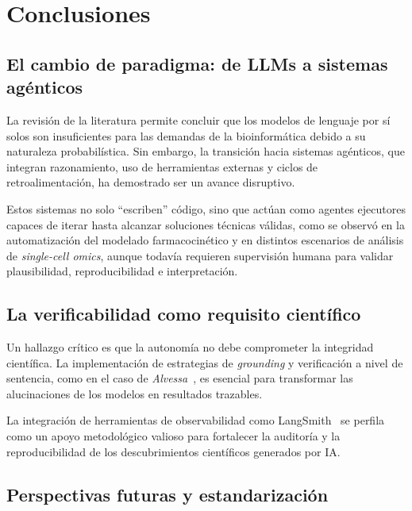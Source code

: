 
\section{Conclusiones}\label{sec:conclusions}

\subsection{El cambio de paradigma: de LLMs a sistemas agénticos}
\label{subsec:paradigm-shift}

La revisión de la literatura permite concluir que los modelos de lenguaje por sí
solos son insuficientes para las demandas de la bioinformática debido a su
naturaleza probabilística. Sin embargo, la transición hacia sistemas agénticos,
que integran razonamiento, uso de herramientas externas y ciclos de
retroalimentación, ha demostrado ser un avance disruptivo.

Estos sistemas no solo ``escriben'' código, sino que actúan como agentes
ejecutores capaces de iterar hasta alcanzar soluciones técnicas válidas, como se
observó en la automatización del modelado farmacocinético y en distintos
escenarios de análisis de \textit{single-cell omics}, aunque todavía requieren
supervisión humana para validar plausibilidad, reproducibilidad e interpretación.

\subsection{La verificabilidad como requisito científico}
\label{subsec:verifiability}

Un hallazgo crítico es que la autonomía no debe comprometer la integridad
científica. La implementación de estrategias de \textit{grounding} y
verificación a nivel de sentencia, como en el caso de
\textit{Alvessa}~\citep{41502944}, es esencial para transformar las
alucinaciones de los modelos en resultados trazables.

La integración de herramientas de observabilidad como
LangSmith~\citep{LangSmithObservability2026,LangSmithConcepts2026} se perfila
como un apoyo metodológico valioso para fortalecer la auditoría y la
reproducibilidad de los descubrimientos científicos generados por IA.

\subsection{Perspectivas futuras y estandarización}
\label{subsec:future-standardization}


